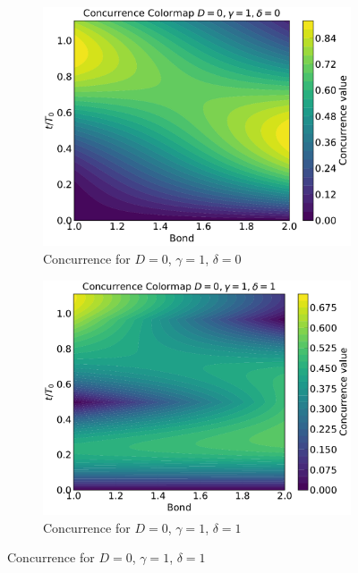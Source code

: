 \begin{figure}[h!]
    \centering
    \begin{subfigure}[b]{0.48\textwidth}
        \centering
        \includegraphics[width=\linewidth]{results_and_discussion/3_qubits/up_down_with_ana_0_1_0.pdf}
        \caption{Concurrence for \( D = 0\), \( \gamma = 1\), \( \delta = 0\)}
        \label{fig:subfig1}
    \end{subfigure}
    \hfill
    \begin{subfigure}[b]{0.48\textwidth}
        \centering
        \includegraphics[width=\linewidth]{results_and_discussion/3_qubits/up_down_with_ana_0_1_1.pdf}
        \caption{Concurrence for \( D = 0\), \( \gamma = 1\), \( \delta = 1\)}
        \label{fig:subfig2}
    \end{subfigure}


\end{figure}
